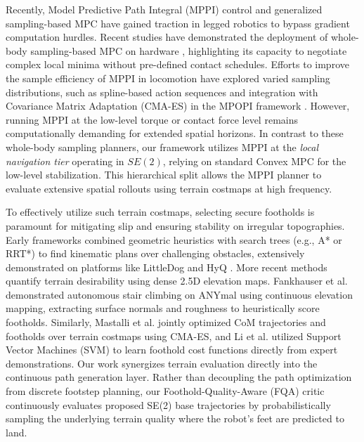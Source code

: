 \documentclass[letterpaper, 10 pt, conference]{ieeeconf}  %
\begin{document}
Recently, Model Predictive Path Integral (MPPI) control \cite{Williams2016MPPI} and generalized sampling-based MPC have gained traction in legged robotics to bypass gradient computation hurdles. Recent studies have demonstrated the deployment of whole-body sampling-based MPC on hardware \cite{Palo2024WholeBody}, highlighting its capacity to negotiate complex local minima without pre-defined contact schedules. Efforts to improve the sample efficiency of MPPI in locomotion have explored varied sampling distributions, such as spline-based action sequences \cite{Carius2026SamplingStrategies} and integration with Covariance Matrix Adaptation (CMA-ES) in the MPOPI framework \cite{Jiang2025MPOPI}. However, running MPPI at the low-level torque or contact force level remains computationally demanding for extended spatial horizons. In contrast to these whole-body sampling planners, our framework utilizes MPPI at the \textit{local navigation tier} operating in $SE(2)$, relying on standard Convex MPC for the low-level stabilization. This hierarchical split allows the MPPI planner to evaluate extensive spatial rollouts using terrain costmaps at high frequency.

To effectively utilize such terrain costmaps, selecting secure footholds is paramount for mitigating slip and ensuring stability on irregular topographies. Early frameworks combined geometric heuristics with search trees (e.g., A* or RRT*) to find kinematic plans over challenging obstacles, extensively demonstrated on platforms like LittleDog \cite{Kolter2008ControlArchitecture} and HyQ \cite{Winkler2014PathPlanning}. More recent methods quantify terrain desirability using dense 2.5D elevation maps. Fankhauser et al. \cite{Fankhauser2018Robust} demonstrated autonomous stair climbing on ANYmal using continuous elevation mapping, extracting surface normals and roughness to heuristically score footholds. Similarly, Mastalli et al. \cite{Mastalli2017Trajectory} jointly optimized CoM trajectories and footholds over terrain costmaps using CMA-ES, and Li et al. \cite{Li2019LearningCost} utilized Support Vector Machines (SVM) to learn foothold cost functions directly from expert demonstrations. Our work synergizes terrain evaluation directly into the continuous path generation layer. Rather than decoupling the path optimization from discrete footstep planning, our Foothold-Quality-Aware (FQA) critic continuously evaluates proposed SE(2) base trajectories by probabilistically sampling the underlying terrain quality where the robot's feet are predicted to land.
\end{document}
